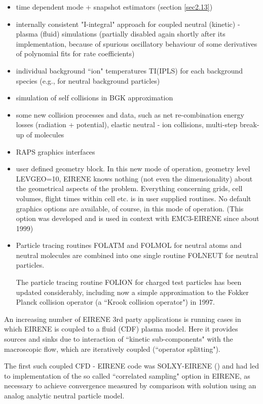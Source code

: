 \begin{itemize}
\item[-] time dependent mode + snapshot estimators (section \ref{sec2.13})
\item[-] internally consistent "I-integral" approach for coupled
neutral (kinetic) - plasma (fluid) simulations (partially
disabled again shortly after its implementation, because of spurious oscillatory
behaviour of some derivatives of polynomial fits for rate coefficients)
\item[-] individual background ``ion" temperatures TI(IPLS) for each
background species (e.g., for neutral background particles)
\item[-] simulation of self collisions in BGK approximation
\item[-] some new collision processes and data, such as
net re-combination energy losses (radiation + potential), elastic
neutral - ion collisions, multi-step break-up of molecules
\item[-] RAPS graphics interfaces
\item[-] user defined geometry block. In this new mode of operation, geometry level
LEVGEO=10, EIRENE knows nothing (not even the dimensionality) about the
geometrical aspects of the problem. Everything concerning grids, cell
volumes, flight times within cell etc. is in user supplied routines.
No default
graphics options are
available, of course, in this mode of operation.
(This option was developed and is used in context with EMC3-EIRENE since about 1999)
\item[-] Particle tracing routines FOLATM and FOLMOL for neutral atoms and
neutral molecules are combined into one single routine FOLNEUT for neutral
particles.

The particle tracing routine FOLION for charged test particles has been
updated considerably, including now a simple approximation to the
Fokker Planck collision operator (a ``Krook collision operator") in 1997.
\end{itemize}
\bigskip
An increasing number of EIRENE 3rd party applications is running cases in which
EIRENE is coupled to a fluid (CDF) plasma model.
Here it provides sources and sinks due to interaction
of ``kinetic sub-components" with the macroscopic flow, which are iteratively
coupled (``operator splitting").

The first such coupled CFD - EIRENE code was SOLXY-EIRENE (\cite{kn:Gerhauser88a})
and had led to
implementation of the so called ``correlated sampling" option in EIRENE,
as necessary to
achieve convergence measured by comparison with solution using an analog
analytic neutral particle model.


